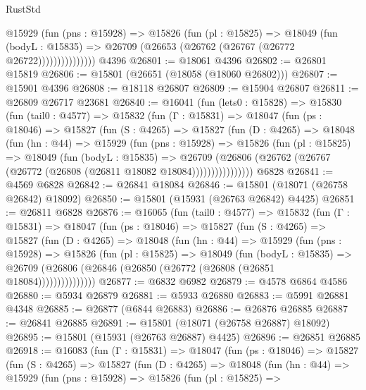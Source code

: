 \begin{lexlean}{RustStd}
\begin{coremodule}
                  @15929
                    (fun (pns : @15928) =>
                    @15826
                      (fun (pl : @15825) =>
                      @18049
                        (fun (bodyL : @15835) =>
                        @26709 (@26653 (@26762 (@26767 (@26772 @26722)))))))))))))))
    @4396
@26801 := @18061 @4396
@26802 := @26801 @15819
@26806 := @15801 (@26651 (@18058 (@18060 @26802)))
@26807 := @15901 @4396
@26808 := @18118 @26807
@26809 := @15904 @26807
@26811 := @26809 @26717 @23681
@26840 := @16041
    (fun (lets0 : @15828) =>
    @15830
      (fun (tail0 : @4577) =>
      @15832
        (fun (Γ : @15831) =>
        @18047
          (fun (ps : @18046) =>
          @15827
            (fun (S : @4265) =>
            @15827
              (fun (D : @4265) =>
              @18048
                (fun (hn : @44) =>
                @15929
                  (fun (pns : @15928) =>
                  @15826
                    (fun (pl : @15825) =>
                    @18049
                      (fun (bodyL : @15835) =>
                      @26709
                        (@26806
                          (@26762 (@26767 (@26772 (@26808 (@26811 @18082 @18084))))))))))))))))
    @6828
@26841 := @4569 @6828
@26842 := @26841 @18084
@26846 := @15801 (@18071 (@26758 @26842) @18092)
@26850 := @15801 (@15931 (@26763 @26842) @4425)
@26851 := @26811 @6828
@26876 := @16065
    (fun (tail0 : @4577) =>
    @15832
      (fun (Γ : @15831) =>
      @18047
        (fun (ps : @18046) =>
        @15827
          (fun (S : @4265) =>
          @15827
            (fun (D : @4265) =>
            @18048
              (fun (hn : @44) =>
              @15929
                (fun (pns : @15928) =>
                @15826
                  (fun (pl : @15825) =>
                  @18049
                    (fun (bodyL : @15835) =>
                    @26709 (@26806 (@26846 (@26850 (@26772 (@26808 (@26851 @18084)))))))))))))))
@26877 := @6832 @6982
@26879 := @4578 @6864 @4586
@26880 := @5934 @26879
@26881 := @5933 @26880
@26883 := @5991 @26881 @4348
@26885 := @26877 (@6844 @26883)
@26886 := @26876 @26885
@26887 := @26841 @26885
@26891 := @15801 (@18071 (@26758 @26887) @18092)
@26895 := @15801 (@15931 (@26763 @26887) @4425)
@26896 := @26851 @26885
@26918 := @16083
    (fun (Γ : @15831) =>
    @18047
      (fun (ps : @18046) =>
      @15827
        (fun (S : @4265) =>
        @15827
          (fun (D : @4265) =>
          @18048
            (fun (hn : @44) =>
            @15929
              (fun (pns : @15928) =>
              @15826
                (fun (pl : @15825) =>

\end{coremodule}
\end{lexlean}
